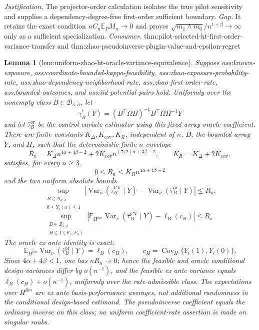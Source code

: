 \documentclass{article}
\newtheorem{lemma}{Lemma}
\begin{document}
\par\smallskip\noindent \textit{Justification.} The projector-order calculation isolates the true pilot sensitivity and supplies a dependency-degree-free first-order sufficient boundary. \textit{Gap.} It retains the exact condition \(nC_n\mathbb E_PM_n\to0\) and proves \(\sqrt{m_1\wedge m_0}/n^{1+\beta}\to\infty\) only as a sufficient specialization. \textit{Consumer.} thm:pilot-selected-ht-first-order-variance-transfer and thm:zhao-pseudoinverse-plugin-value-and-epsilon-regret

\begin{lemma}[lem:uniform-zhao-ht-oracle-variance-equivalence]\label{lem:uniform-zhao-ht-oracle-variance-equivalence}
Suppose ass:known-exposure, ass:coordinate-bounded-kappa-feasibility, ass:zhao-exposure-probability-rate, ass:zhao-dependency-neighborhood-rate, ass:zhao-first-order-rate, ass:bounded-outcomes, and ass:iid-potential-pairs hold.  Uniformly over the nonempty class \(B\in\mathcal B_{\kappa,\overline a}\), let
\[
\gamma_B^*(Y)=(B^{\top}\Omega B)^{-1}B^{\top}\Omega\Pi^{-1}Y
\]
and let \(\widehat\tau_B^{\mathrm{or}}\) be the control-variate estimator using this fixed-array oracle coefficient.  There are finite constants \(K_\Delta,K_{\mathrm{cov}},K_R\), independent of \(n\), \(B\), the bounded array \(Y\), and \(H\), such that the deterministic finite-\(n\) envelope
\[
R_n=K_\Delta n^{4\alpha+4\beta-2}
+2K_{\mathrm{cov}}n^{(7/2)\alpha+3\beta-2},
\qquad K_R=K_\Delta+2K_{\mathrm{cov}},
\]
satisfies, for every \(n\ge3\),
\[
0\le R_n\le K_Rn^{4\alpha+4\beta-2}
\]
and the two uniform absolute bounds
\[
\sup_{\substack{B\in\mathcal B_{\kappa,\overline a}\\0\le Y_i(a)\le1}}
\left|
\operatorname{Var}_\nu(\widehat\tau_B^{\mathrm{CV}}\mid Y)
-\operatorname{Var}_\nu(\widehat\tau_B^{\mathrm{or}}\mid Y)
\right|
\le R_n,
\]
\[
\sup_{\substack{B\in\mathcal B_{\kappa,\overline a}\\H\in\Gamma(F_1,F_0)}}
\left|
\mathbb E_{H^{\otimes n}}
\operatorname{Var}_\nu(\widehat\tau_B^{\mathrm{CV}}\mid Y)
-\ell_B(c_H)
\right|
\le R_n.
\]
The oracle ex ante identity is exact:
\[
\mathbb E_{H^{\otimes n}}
\operatorname{Var}_\nu(\widehat\tau_B^{\mathrm{or}}\mid Y)
=\ell_B(c_H),
\qquad
c_H=\operatorname{Cov}_H\{Y_i(1),Y_i(0)\}.
\]
Since \(4\alpha+4\beta<1\), one has \(nR_n\to0\); hence the feasible and oracle conditional design variances differ by \(o(n^{-1})\), and the feasible ex ante variance equals \(\ell_B(c_H)+o(n^{-1})\), uniformly over the rate-admissible class.  The expectations over \(H^{\otimes n}\) are ex ante basis-performance averages, not additional randomness in the conditional design-based estimand.  The pseudoinverse coefficient equals the ordinary inverse on this class; no uniform coefficient-rate assertion is made on singular ranks.
\end{lemma}
\end{document}
